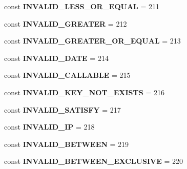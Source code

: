 \begin{DoxyCompactItemize}
const {\bfseries I\+N\+V\+A\+L\+I\+D\+\_\+\+L\+E\+S\+S\+\_\+\+O\+R\+\_\+\+E\+Q\+U\+AL} = 211
\item 
\mbox{\label{class_assert_1_1_assertion_ac9dbdeee10e7ecaaffcd7b6671f5d0bc}} 
const {\bfseries I\+N\+V\+A\+L\+I\+D\+\_\+\+G\+R\+E\+A\+T\+ER} = 212
\item 
\mbox{\label{class_assert_1_1_assertion_a0626d479edb038cadd9694561875f35f}} 
const {\bfseries I\+N\+V\+A\+L\+I\+D\+\_\+\+G\+R\+E\+A\+T\+E\+R\+\_\+\+O\+R\+\_\+\+E\+Q\+U\+AL} = 213
\item 
\mbox{\label{class_assert_1_1_assertion_a83fd65fbf0d969f25955b6970c01ac06}} 
const {\bfseries I\+N\+V\+A\+L\+I\+D\+\_\+\+D\+A\+TE} = 214
\item 
\mbox{\label{class_assert_1_1_assertion_a107ba46b6f74d86e4a9c3884a23c9ec5}} 
const {\bfseries I\+N\+V\+A\+L\+I\+D\+\_\+\+C\+A\+L\+L\+A\+B\+LE} = 215
\item 
\mbox{\label{class_assert_1_1_assertion_a3d5e3317d11665996d0672e15c0f4fa5}} 
const {\bfseries I\+N\+V\+A\+L\+I\+D\+\_\+\+K\+E\+Y\+\_\+\+N\+O\+T\+\_\+\+E\+X\+I\+S\+TS} = 216
\item 
\mbox{\label{class_assert_1_1_assertion_adda9e2dc9bd116250635622495f55c74}} 
const {\bfseries I\+N\+V\+A\+L\+I\+D\+\_\+\+S\+A\+T\+I\+S\+FY} = 217
\item 
\mbox{\label{class_assert_1_1_assertion_a52f3afbb591f94227d882b00e1a86925}} 
const {\bfseries I\+N\+V\+A\+L\+I\+D\+\_\+\+IP} = 218
\item 
\mbox{\label{class_assert_1_1_assertion_a7668952e976a8a0771e4bbf34f8748fe}} 
const {\bfseries I\+N\+V\+A\+L\+I\+D\+\_\+\+B\+E\+T\+W\+E\+EN} = 219
\item 
\mbox{\label{class_assert_1_1_assertion_aef842e53a9a8f5aa3c90d52bddcfd1f2}} 
const {\bfseries I\+N\+V\+A\+L\+I\+D\+\_\+\+B\+E\+T\+W\+E\+E\+N\+\_\+\+E\+X\+C\+L\+U\+S\+I\+VE} = 220
\item 

\end{DoxyCompactItemize}

